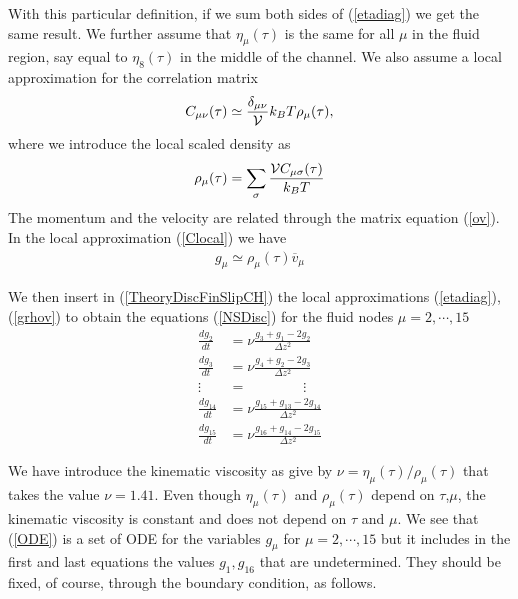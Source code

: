 \documentclass[b5paper,openright,10pt]{book}
\begin{document}
With   this  particular   definition,  if   we  sum   both  sides   of
(\ref{etadiag})  we  get the  same  result.   We further  assume  that
$\eta_\mu(\tau)$ is  the same for all  $\mu$ in the fluid  region, say
equal to $\eta_{8}(\tau)$ in the middle of the channel.
We also assume a local approximation for the correlation matrix
\begin{align}
C_{\mu\nu}(\tau)\simeq\frac{\delta_{\mu\nu}}{{\cal    V}}k_BT   \rho_\mu(\tau),
\label{Clocal}
\end{align}
 where we introduce the local scaled density as
\begin{align}
\rho_\mu(\tau)=\sum_\sigma  \frac{{\cal  V}  C_{\mu\sigma}(\tau)}{k_BT  }
\end{align}
The momentum and the velocity  are related through the matrix equation
(\ref{ov}). In the  local approximation (\ref{Clocal}) we have
\begin{align}
  g_\mu\simeq\rho_\mu(\tau)\overline{v}_\mu
\label{grhov}
\end{align}




We  then  insert  in (\ref{TheoryDiscFinSlipCH})  the  local  approximations
(\ref{etadiag}), (\ref{grhov}) to  obtain the equations (\ref{NSDisc})
for the fluid nodes $\mu=2,\cdots,15$
\begin{align}
  \frac{d g_2}{dt}&= \nu\frac{g_3+g_1-2g_2}{\Delta z^2}
\nonumber\\
  \frac{d g_3}{dt}&=\nu\frac{g_4+g_2-2g_3}{\Delta z^2}
\nonumber\\
\vdots\;\;&=\quad\quad\quad\quad\vdots
\nonumber\\
  \frac{d g_{14}}{dt}&=\nu\frac{ g_{15}+ g_{13}-2g_{14}}{\Delta z^2}
\nonumber\\
  \frac{d g_{15}}{dt}&=
\nu\frac{g_{16}+g_{14}-2g_{15}}{\Delta z^2}
\label{ODE}
\end{align}

We have introduce the kinematic viscosity as give by $\nu=\eta_{\mu}(\tau)/\rho_{\mu}(\tau)$ that takes the value $\nu=1.41$. Even though $\eta_{\mu}(\tau)$ and $\rho_{\mu}(\tau)$ depend on $\tau$,$\mu$, the kinematic viscosity is constant and does not depend on $\tau$ and $\mu$.
We see that 
(\ref{ODE}) is a set of ODE for the variables $g_\mu$ for
$\mu=2,\cdots,15$ but it includes in the first and last equations the
values $g_1,g_{16}$ that are undetermined. They
should be fixed, of course, through the boundary condition, as follows.
\end{document}
